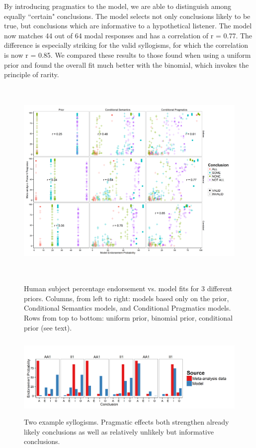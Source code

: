\documentclass[10pt,letterpaper]{article}
\begin{document}
By introducing pragmatics to the model, we are able to distinguish among equally ``certain" conclusions. The model selects not only conclusions likely to be true, but conclusions which are informative to a hypothetical listener. The model now matches 44 out of 64 modal responses and has a correlation of r = 0.77. The difference is especially striking for the valid syllogisms, for which the correlation is now r = 0.85. We compared these results to those found when using a uniform prior and found the overall fit much better with the binomial, which invokes the principle of rarity. 

\begin{figure}[t!] %
\centering
	\subfigure
		\centering
  \includegraphics[width=\textwidth,height=10cm]{multiScatter_unif-bin-2m40br_n6_alphabefore2}
  \caption{Human subject percentage endorsement vs. model fits for 3 different priors. Columns, from left to right: models based only on the prior, Conditional Semantics models, and Conditional Pragmatics models. Rows from top to bottom: uniform prior, binomial prior, conditional prior (see text).}
  \label{fig:megaScatter}
\subfigure

    \includegraphics[width=\textwidth,height=4cm]{multibar_AA1_II1_luceSpeak2}
    \caption{Two example syllogisms. Pragmatic effects both strengthen already likely conclusions as well as relatively unlikely but informative conclusions.}
  \label{fig:barplots}

\end{figure}
\end{document}
